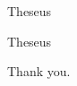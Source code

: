 \documentclass[svgnames,11pt]{beamer}
\begin{document}
\begin{frame}[fragile]{Theseus}

  \begin{block}
    
%






  \end{block}


\end{frame}

\begin{frame}[fragile]{Theseus}

  \begin{block}
    
%
%






  \end{block}


\end{frame}







\begin{frame}

  \begin{center}
    Thank you.
  \end{center}


\end{frame}
\end{document}

